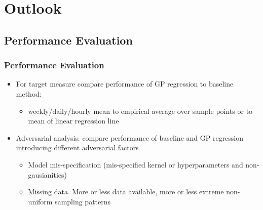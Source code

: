 \documentclass[
	8pt, %
]{beamer}
\begin{document}
\section{Outlook}%


\subsection{Performance Evaluation}

\begin{frame}
	\frametitle{Performance Evaluation}

	\begin{itemize}
		\item For target measure compare performance of GP regression to baseline method:
		\begin{itemize}
			\item weekly/daily/hourly mean to empirical average over sample points or to mean of linear regression line
		\end{itemize}
	\end{itemize}

	\bigskip %

	\begin{itemize}
		\item Adversarial analysis: compare performance of baseline and GP regression introducing different adversarial
		factors
		\begin{itemize}
			\item Model mis-specification (mis-specified kernel or hyperparameters and non-gausianities)
			\item Missing data. More or less data available, more or less extreme non-uniform sampling patterns
		\end{itemize}

	\end{itemize}

\end{frame}
\end{document}
